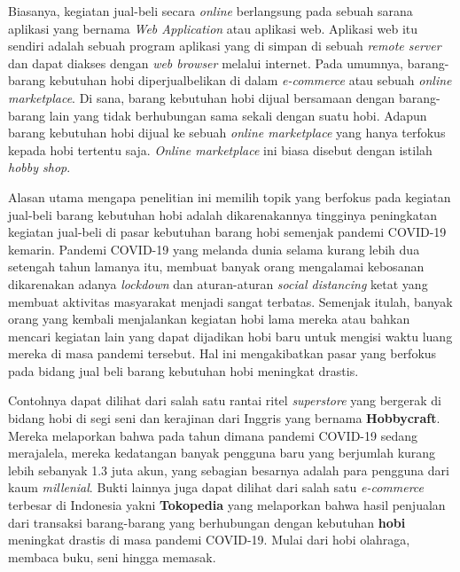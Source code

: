 \documentclass[a4paper]{article}
\begin{document}
Biasanya, kegiatan jual-beli secara \textit{online} berlangsung pada sebuah sarana aplikasi yang bernama \textit{Web Application} atau aplikasi web. Aplikasi web itu sendiri adalah sebuah program aplikasi yang di simpan di sebuah \textit{remote server} dan dapat diakses dengan \textit{web browser} melalui internet\autocite{what-is-web-app}. Pada umumnya, barang-barang kebutuhan hobi diperjualbelikan di dalam \textit{e-commerce} atau sebuah \textit{online marketplace}. Di sana, barang kebutuhan hobi dijual bersamaan dengan barang-barang lain yang tidak berhubungan sama sekali dengan suatu hobi. Adapun barang kebutuhan hobi dijual ke sebuah \textit{online marketplace} yang hanya terfokus kepada hobi tertentu saja. \textit{Online marketplace} ini biasa disebut dengan istilah \textit{hobby shop}.

Alasan utama mengapa penelitian ini memilih topik yang berfokus pada kegiatan jual-beli barang kebutuhan hobi adalah dikarenakannya tingginya peningkatan kegiatan jual-beli di pasar kebutuhan barang hobi semenjak pandemi COVID-19 kemarin. Pandemi COVID-19 yang melanda dunia selama kurang lebih dua setengah tahun lamanya itu, membuat banyak orang mengalamai kebosanan dikarenakan adanya \textit{lockdown} dan aturan-aturan \textit{social distancing} ketat yang membuat aktivitas masyarakat menjadi sangat terbatas\autocite{boredom-in-covid-19-pandemic}. Semenjak itulah, banyak orang yang kembali menjalankan kegiatan hobi lama mereka atau bahkan mencari kegiatan lain yang dapat dijadikan hobi baru untuk mengisi waktu luang mereka di masa pandemi tersebut. Hal ini mengakibatkan pasar yang berfokus pada bidang jual beli barang kebutuhan hobi meningkat drastis.

Contohnya dapat dilihat dari salah satu rantai ritel \textit{superstore} yang bergerak di bidang hobi di segi seni dan kerajinan dari Inggris yang bernama \textbf{Hobbycraft}. Mereka melaporkan bahwa pada tahun dimana pandemi COVID-19 sedang merajalela, mereka kedatangan banyak pengguna baru yang berjumlah kurang lebih sebanyak 1.3 juta akun, yang sebagian besarnya adalah para pengguna dari kaum \textit{millenial}\autocite{hobbycraft-fast-online-growth}. Bukti lainnya juga dapat dilihat dari salah satu \textit{e-commerce} terbesar di Indonesia yakni \textbf{Tokopedia} yang melaporkan bahwa hasil penjualan dari transaksi barang-barang yang berhubungan dengan kebutuhan \textbf{hobi} meningkat drastis di masa pandemi COVID-19. Mulai dari hobi olahraga, membaca buku, seni hingga memasak\autocite{tokped-hobbies-goods-sales-increased}.
\end{document}

